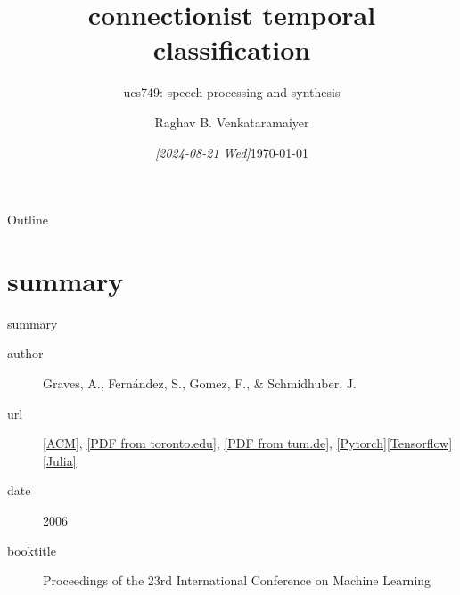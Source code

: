 \documentclass[aspectratio=169,xcolor={dvipsnames,svgnames}]{beamer}
\date{\textit{[2024-08-21 Wed]}}
\title{connectionist temporal classification}
\subtitle{ucs749: speech processing and synthesis}
\author{%
\normalsize Raghav B. Venkataramaiyer
}
\institute{%
CSED TIET Patiala India.
}
\date{\scriptsize \today}
\begin{document}
\maketitle
\begin{frame}{Outline}
\tableofcontents
\end{frame}


\section{summary}
\label{sec:orgfb5af38}

\begin{frame}[label={sec:orgc764a22}]{summary}
\begin{description}
\item[{author}] Graves, A., Fernández, S., Gomez, F., \&
Schmidhuber, J.
\item[{url}] \href{https://dl.acm.org/doi/10.1145/1143844.1143891}{[ACM]​}, \href{https://www.cs.toronto.edu/\~graves/icml\_2006.pdf}{[PDF from toronto.edu]​}, \href{https://mediatum.ub.tum.de/doc/1292048/document.pdf}{[PDF from
tum.de]​}, \href{https://pytorch.org/docs/stable/generated/torch.nn.CTCLoss.html}{[Pytorch]​} \href{https://www.tensorflow.org/api\_docs/python/tf/nn/ctc\_loss}{[Tensorflow]​} \href{https://github.com/maetshju/flux-ctc-grad}{[Julia]​}
\item[{date}] 2006
\item[{booktitle}] Proceedings of the 23rd International
Conference on Machine Learning
\end{description}
\end{frame}
\end{document}
